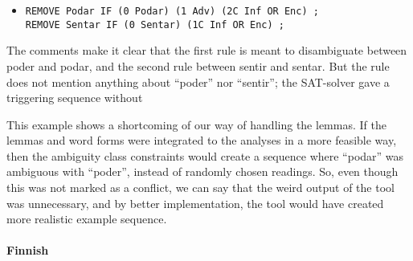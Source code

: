 




\begin{itemize}
\item[] 
\texttt{REMOVE Podar  IF (0 Podar) (1 Adv) (2C Inf OR Enc) ;} \\
\texttt{REMOVE Sentar IF (0 Sentar) (1C Inf OR Enc) ;}
\end{itemize}

The comments make it clear that the first rule is meant to disambiguate between poder and podar, and the second rule between sentir and sentar. But the rule does not mention anything about ``poder'' nor ``sentir''; the SAT-solver gave a triggering sequence without 

This example shows a shortcoming of our way of handling the lemmas. If
the lemmas and word forms were integrated to the analyses in a more
feasible way, then the ambiguity class constraints would create a
sequence where ``podar'' was ambiguous with ``poder'', instead of randomly chosen readings. So, even though this was not marked as a conflict, we can say that the weird output of the tool was unnecessary, and by better implementation, the tool would have created more realistic example sequence.




\paragraph{Finnish} 


